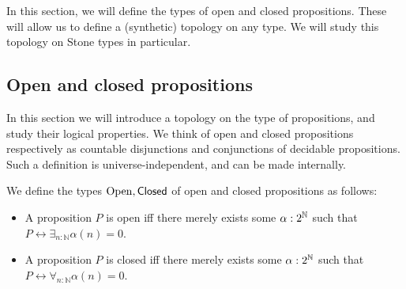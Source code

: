 In this section, we will define the types of open and closed propositions. 
These will allow us to define a (synthetic) topology  \cite{SyntheticTopologyLesnik} on any type.
We will study this topology on Stone types in particular.

\subsection{Open and closed propositions}
In this section we will introduce a topology on the type of propositions, and 
study their logical properties.
We think of open and closed propositions respectively as countable disjunctions and conjunctions of decidable propositions.
Such a definition is universe-independent, and can be made internally.
\begin{definition}
  We define the types $\mathrm{Open}, \mathsf{Closed}$ of open and closed propositions as follows:
  \begin{itemize}
    \item 
    A proposition $P$ is open iff there merely exists some $\alpha:2^{\mathbb{N}}$ such that 
      $P \leftrightarrow \exists_{n:\mathbb N} \alpha(n) = 0$. 
    \item 
    A proposition $P$ is closed iff there merely exists some $\alpha:2^{\mathbb{N}}$ such that 
      $P \leftrightarrow \forall_{n:\mathbb N} \alpha(n) = 0$. 
  \end{itemize}
\end{definition}

